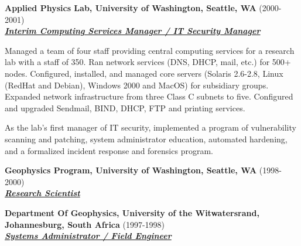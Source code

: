 \documentclass{article}
\newcommand{\employer}[3]{{ \textbf{#1} (#2)\\ \underline{\textbf{\emph{#3}}}\\  }}
\newenvironment{achievements}{\begin{list}{\topsep 0pt \itemsep -2pt}} {\vspace*{4pt}\end{list}}
\begin{document}
\employer{Applied Physics Lab, University of Washington, Seattle, WA
}{2000-2001}{Interim Computing Services Manager / IT Security Manager}
\begin{achievements}
    \item Managed a team of four staff providing central computing services for a research lab with a staff of 350. Ran network services (DNS, DHCP, mail, etc.) for 500+ nodes. Configured, installed, and managed core servers (Solaris 2.6-2.8, Linux (RedHat and Debian), Windows 2000 and MacOS) for subsidiary groups.  Expanded network infrastructure from three Class C subnets to five.  Configured and upgraded Sendmail, BIND, DHCP, FTP and printing services.
    \item As the lab's first manager of IT security, implemented a program of vulnerability scanning and patching, system administrator education, automated hardening, and a formalized incident response and forensics program.
\end{achievements}

\employer{Geophysics Program, University of Washington, Seattle, WA}{1998-2000}{Research Scientist}

\employer{Department Of Geophysics, University of the Witwatersrand,
Johannesburg, South Africa}{1997-1998}{Systems Administrator / Field Engineer}
\end{document}
